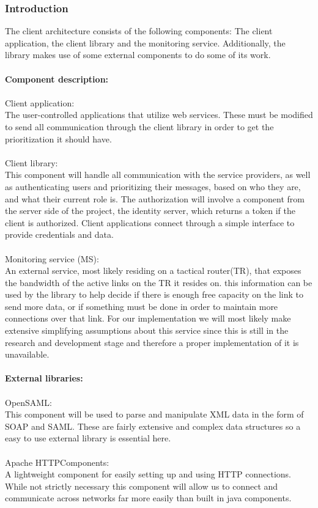     \subsubsection{Introduction}\label{client introduction}
The client architecture consists of the following components: The client application, the client library and the monitoring service. Additionally, the library makes use of some external components to do some of its work.
\\\\
\textbf{Component description:}
\\\\
Client application:\\
	The user-controlled applications that utilize web services. These must be modified to send all communication through the client library in order to get the prioritization it should have.
\\\\
Client library:\\
This component will handle all communication with the service providers, as well as authenticating users and prioritizing their messages, based on who they are, and what their current role is. The authorization will involve a component from the server side of the project, the identity server, which returns a token if the client is authorized. Client applications connect through a simple interface to provide credentials and data.
\\\\
Monitoring service (MS):\\
An external service, most likely residing on a tactical router(TR), that exposes the bandwidth of the active links on the TR it resides on. this information can be used by the library to help decide  if there is enough free capacity on the link to send more data, or if something must be done in order to maintain more connections over that link.
For our implementation we will most likely make extensive simplifying assumptions about this service since this is still in the research and development stage and therefore a proper implementation of it is unavailable. 
\\\\
\textbf{External libraries:}
\\\\
OpenSAML:\\
This component will be used to parse and manipulate XML data in the form of SOAP and SAML. These are fairly extensive and complex data structures so a easy to use external library is essential here.
\\\\
Apache HTTPComponents:\\
A lightweight component for easily setting up and using HTTP connections.
While not strictly necessary this component will allow us to connect and communicate across networks far more easily than built in java components.

